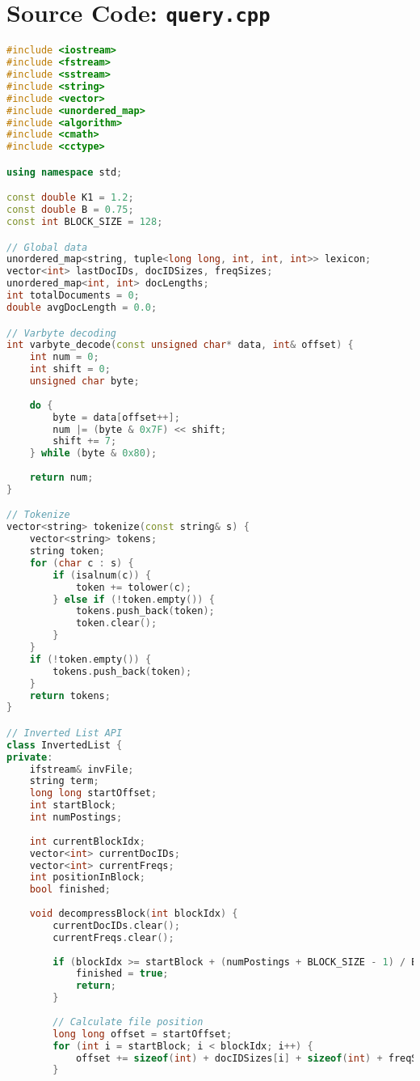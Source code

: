 \documentclass[11pt, a4paper]{report}
\begin{document}
\section{Source Code: \texttt{query.cpp}}
\begin{lstlisting}[language=C++, caption={The complete source code for the query processor.}, label={lst:query}]
#include <iostream>
#include <fstream>
#include <sstream>
#include <string>
#include <vector>
#include <unordered_map>
#include <algorithm>
#include <cmath>
#include <cctype>

using namespace std;

const double K1 = 1.2;
const double B = 0.75;
const int BLOCK_SIZE = 128;

// Global data
unordered_map<string, tuple<long long, int, int, int>> lexicon;
vector<int> lastDocIDs, docIDSizes, freqSizes;
unordered_map<int, int> docLengths;
int totalDocuments = 0;
double avgDocLength = 0.0;

// Varbyte decoding
int varbyte_decode(const unsigned char* data, int& offset) {
    int num = 0;
    int shift = 0;
    unsigned char byte;
    
    do {
        byte = data[offset++];
        num |= (byte & 0x7F) << shift;
        shift += 7;
    } while (byte & 0x80);
    
    return num;
}

// Tokenize
vector<string> tokenize(const string& s) {
    vector<string> tokens;
    string token;
    for (char c : s) {
        if (isalnum(c)) {
            token += tolower(c);
        } else if (!token.empty()) {
            tokens.push_back(token);
            token.clear();
        }
    }
    if (!token.empty()) {
        tokens.push_back(token);
    }
    return tokens;
}

// Inverted List API
class InvertedList {
private:
    ifstream& invFile;
    string term;
    long long startOffset;
    int startBlock;
    int numPostings;
    
    int currentBlockIdx;
    vector<int> currentDocIDs;
    vector<int> currentFreqs;
    int positionInBlock;
    bool finished;
    
    void decompressBlock(int blockIdx) {
        currentDocIDs.clear();
        currentFreqs.clear();
        
        if (blockIdx >= startBlock + (numPostings + BLOCK_SIZE - 1) / BLOCK_SIZE) {
            finished = true;
            return;
        }
        
        // Calculate file position
        long long offset = startOffset;
        for (int i = startBlock; i < blockIdx; i++) {
            offset += sizeof(int) + docIDSizes[i] + sizeof(int) + freqSizes[i];
        }
        

\end{lstlisting}
\end{document}
